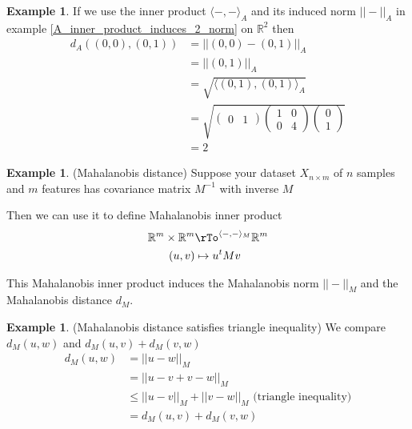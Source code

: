 \documentclass[12pt]{amsart}
\theoremstyle{definition}
\newtheorem{example}[theorem]{Example}
\begin{document}
\begin{example} If we use the inner product $\langle -,- \rangle_A$ and its induced norm $||-||_A$ in example \ref{A_inner_product_induces_2_norm} on $\mathbb{R}^2$ then
\begin{align*}
d_A ((0, 0), (0, 1)) & = ||(0, 0) - (0, 1)||_A \\
 & = ||(0, 1)||_A \\
 & = \sqrt{\langle (0, 1), (0, 1) \rangle_A} \\
 & = \sqrt{\left( \begin{array}{cc} 0 & 1 \end{array} \right) \left( \begin{array}{cc} 1 & 0 \\ 0 & 4 \end{array} \right) \left( \begin{array}{c} 0 \\ 1 \end{array} \right)} \\
 & = 2
\end{align*}
\end{example}
\vfill
\pagebreak

\begin{example} (Mahalanobis distance) Suppose your dataset $X_{n \times m}$ of $n$ samples and $m$ features has covariance matrix $M^{-1}$ with inverse $M$

Then we can use it to define Mahalanobis inner product
\begin{align*}
\mathbb{R}^m \times \mathbb{R}^m & \rTo^{\langle -, - \rangle_M} \mathbb{R}^m \\
(u, v) & \mapsto u^t M v
\end{align*}

This Mahalanobis inner product induces the Mahalanobis norm $||-||_M$ and the Mahalanobis distance $d_M$.
\end{example}
\vspace{30pt}

\begin{example} (Mahalanobis distance satisfies triangle inequality) We compare $d_M(u, w)$ and $d_M(u, v) + d_M(v, w)$
\begin{align*}
d_M(u, w) & = ||u - w||_M \\
 & = ||u - v + v - w||_M \\
 & \leq ||u - v||_M + ||v - w||_M \text{ (triangle inequality)} \\
 & = d_M(u, v) + d_M(v, w)
\end{align*}
\end{example}
\vfill
\pagebreak
\end{document}
